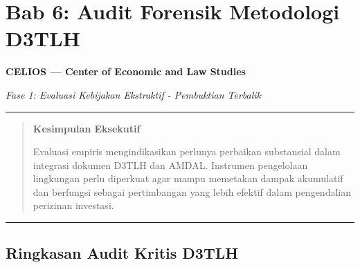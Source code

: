 \documentclass[
]{article}
\author{}
\date{}
\begin{document}
\section{Bab 6: Audit Forensik Metodologi
D3TLH}\label{bab-6-audit-forensik-metodologi-d3tlh}

\textbf{CELIOS --- Center of Economic and Law Studies}

\emph{Fase 1: Evaluasi Kebijakan Ekstraktif - Pembuktian Terbalik}

\begin{center}\rule{0.5\linewidth}{0.5pt}\end{center}

\begin{quote}
\textbf{Kesimpulan Eksekutif}

Evaluasi empiris mengindikasikan perlunya perbaikan substansial dalam
integrasi dokumen D3TLH dan AMDAL. Instrumen pengelolaan lingkungan
perlu diperkuat agar mampu memetakan dampak akumulatif dan berfungsi
sebagai pertimbangan yang lebih efektif dalam pengendalian perizinan
investasi.
\end{quote}

\begin{center}\rule{0.5\linewidth}{0.5pt}\end{center}

\subsection{Ringkasan Audit Kritis
D3TLH}\label{ringkasan-audit-kritis-d3tlh}
\end{document}
